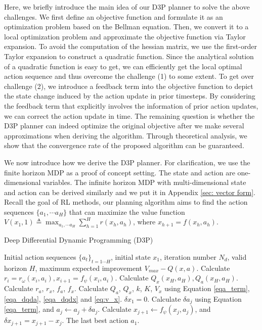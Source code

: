 \documentclass{article} %
\newcommand{\vmax}{V_{max}}
\newcommand{\lijun}[1]{ {#1}}
\newcommand{\yue}[1]{ {#1}}
\begin{document}
Here, we briefly introduce the main idea of our D3P planner to solve the above challenges. We first define an objective function and formulate it as an optimization problem based on the Bellman equation. Then, we convert it to a local optimization problem and approximate the objective function via Taylor expansion.
To avoid the computation of the hessian matrix, we use the first-order Taylor expansion to construct a quadratic function. Since the analytical solution of a quadratic function is easy to get, we can efficiently get the local optimal action sequence and thus overcome the challenge (1) to some extent. To get over challenge (2), we introduce a feedback term into the objective function to depict the state change induced by the action update in prior timesteps. By considering the feedback term that explicitly involves the information of prior action updates, we can correct the action update in time. 
The remaining question is whether the D3P planner can indeed optimize the original objective after we make several approximations when deriving the algorithm. Through theoretical analysis, we show that the convergence rate of the proposed algorithm can be guaranteed.

We now introduce how we derive the D3P planner. For clarification, we use the finite horizon MDP as a proof of concept setting. \yue{The state and action are one-dimensional variables. The infinite horizon MDP with multi-dimensional state and action can be derived similarly and we put it in Appendix \ref{sec: vector form}. }
Recall the goal of RL methods, our planning algorithm aims  to find the action sequences $\{a_1,\cdots a_H \}$ that can maximize the value function \lijun{$V(x_1,1) \triangleq \max_{a_1,\cdots a_H}  \sum_{h=1}^{H} r(x_h, a_h)$, where $x_{h+1} = f(x_h,a_h)$. }


\begin{algorithm}[!tb]
\caption{Deep Differential Dynamic Programming (D3P)}
\label{algo_d3p}
\begin{algorithmic}[1]
\REQUIRE Initial action sequences $\{ a_t \}_{t=1\cdots H}$, initial state ${x}_1$, iteration number $N_d$,  valid horizon $H$, maximum expected improvement $\vmax - Q(x, a)$.
\STATE Calculate $r_i = r_\omega({x}_i, {a}_i), {x}_{i+1} = f_\psi({x}_i, {a}_i)$.
\ENDFOR
{} 
\STATE Calculate $Q_{{x}}({x}_H, {a}_H), Q_{{a}}({x}_H, {a}_H)$. 
\STATE Calculate $r_a$, $r_x$, $f_a$, $f_x$.
\STATE Calculate $Q_a$, $Q_x$, $k$, $K$, $V_x$ using Equation \ref{eqa_term}, \ref{eqa_dqda}, \ref{eqa_dqdx} and \ref{eq:v_x}.
\ENDFOR
\STATE $\delta{x}_1=0$. 
\STATE Calculate $\delta{a}_j$ using Equation \ref{eqa_term}, and ${a}_j\leftarrow {a}_j+ \delta {a}_j$.
\STATE Calculate ${x}_{j+1} \leftarrow f_\psi({x}_j, {a}_j)$, and $\delta {x}_{j+1}= {x}_{j+1} - {x}_{j}$.
\ENDFOR
\ENDFOR
\RETURN The last best action ${a}_1$.
\end{algorithmic}

\end{algorithm}
\end{document}
